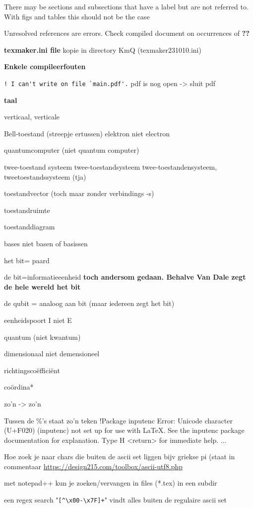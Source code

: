 \documentclass[../../main.tex]{subfiles}
\begin{document}
There may be sections and subsections that have a label but are not referred to. With figs and tables this should not be the case

Unresolved references are errors. Check compiled document on occurrences of \textbf{??}

\textbf{texmaker.ini file}
kopie in directory KmQ (texmaker231010.ini)

\textbf{Enkele compileerfouten}

\verb+! I can't write on file `main.pdf'.+
pdf is nog open -> sluit pdf

\textbf{taal}

verticaal, verticale

Bell-toestand (streepje ertussen)
elektron niet electron

quantumcomputer (niet quantum computer)

twee-toestand systeem twee-toestandsysteem  twee-toestandensysteem, tweetoestandssysteem (tja)

toestandvector (toch maar zonder verbindings -s)

toestandruimte

toestanddiagram

bases niet basen of basissen

het bit= paard

de bit=informatieeenheid  \textbf{toch andersom gedaan. Behalve Van Dale zegt de hele wereld het bit}

de qubit = analoog aan bit (maar iedereen zegt het bit)

eenheidspoort I niet E

quantum (niet kwantum)

dimensionaal niet demensioneel

richtingsco\"effici\"ent 

co\"ordina*

zo’n -> zo'n

Tussen de \%'s staat zo'n teken
!Package inputenc Error: Unicode character (U+F020)
(inputenc) not set up for use with LaTeX.
See the inputenc package documentation for explanation.
Type H <return> for immediate help.
...

Hoe zoek je naar chars die buiten de ascii set liggen bijv griekse pi (staat in commentaar
\url{https://design215.com/toolbox/ascii-utf8.php}

met notepad++ kun je zoeken/vervangen in files (*.tex) in een subdir

een regex search "\verb~[^\x00-\x7F]+~" vindt alles buiten de regulaire ascii set
\end{document}
